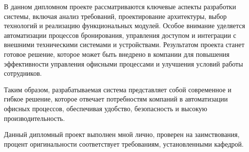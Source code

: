 В данном дипломном проекте рассматриваются ключевые аспекты разработки системы, включая анализ требований, проектирование архитектуры, выбор технологий и реализацию функциональных модулей. Особое внимание уделяется автоматизации процессов бронирования, управления доступом и интеграции с внешними техническими системами и устройствами. Результатом проекта станет готовое решение, которое может быть внедрено в компании для повышения эффективности управления офисными процессами и улучшения условий работы сотрудников.

Таким образом, разрабатываемая система представляет собой современное и гибкое решение, которое отвечает потребностям компаний в автоматизации офисных процессов, обеспечивая удобство, безопасность и высокую производительность.

Данный дипломный проект выполнен мной лично, проверен на заимствования, процент оригинальности соответствует требованиям, установленными кафедрой.
